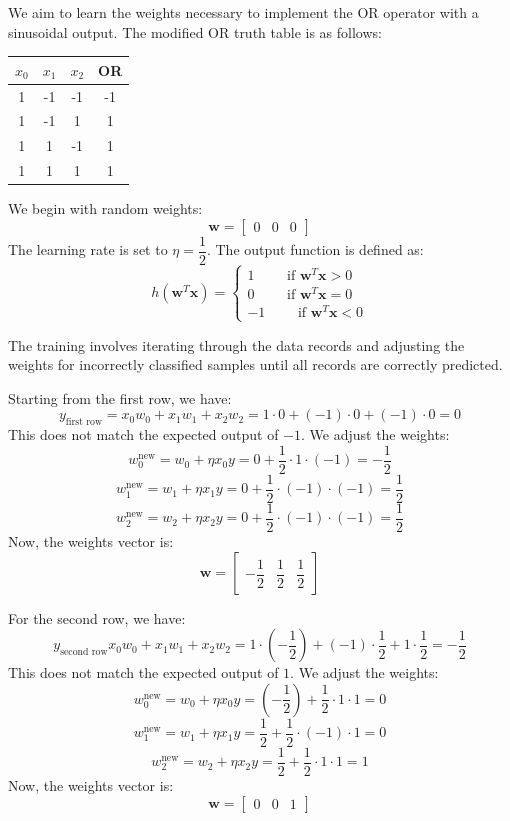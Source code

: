 \begin{example}
    We aim to learn the weights necessary to implement the OR operator with a sinusoidal output. 
    The modified OR truth table is as follows:
    \begin{table}[H]
        \centering
        \begin{tabular}{ccc|c}
        $x_0$ & $x_1$ & $x_2$ & \textbf{OR} \\ \hline
        1     & -1     & -1     & -1           \\
        1     & -1     & 1     & 1           \\
        1     & 1     & -1     & 1           \\
        1     & 1     & 1     & 1          
        \end{tabular}
    \end{table}
    We begin with random weights:
    \[\mathbf{w}=\begin{bmatrix} 0 & 0 & 0 \end{bmatrix}\]
    The learning rate is set to $\eta=\dfrac{1}{2}$. 
    The output function is defined as:
    \[h(\mathbf{w}^T\mathbf{x})=\begin{cases} 1 \qquad\text{ if }\mathbf{w}^T\mathbf{x} > 0 \\ 0 \qquad\text{ if }\mathbf{w}^T\mathbf{x} = 0 \\ -1 \qquad\text{ if }\mathbf{w}^T\mathbf{x} < 0 \end{cases}\]

    The training involves iterating through the data records and adjusting the weights for incorrectly classified samples until all records are correctly predicted.

    Starting from the first row, we have: 
    \[y_{\text{first row}}=x_0w_0+x_1w_1+x_2w_2=1\cdot 0+(-1)\cdot 0 + (-1)\cdot 0=0\]
    This does not match the expected output of $-1$.
    We adjust the weights:
    \[w_0^{\text{new}}=w_0+\eta x_0y=0+\dfrac{1}{2}\cdot 1 \cdot (-1)=-\dfrac{1}{2}\]
    \[w_1^{\text{new}}=w_1+\eta x_1y=0+\dfrac{1}{2}\cdot (-1) \cdot (-1)=\dfrac{1}{2}\]
    \[w_2^{\text{new}}=w_2+\eta x_2y=0+\dfrac{1}{2}\cdot (-1) \cdot (-1)=\dfrac{1}{2}\]
    Now, the weights vector is:
    \[\mathbf{w}=\begin{bmatrix} -\dfrac{1}{2} & \dfrac{1}{2} & \dfrac{1}{2} \end{bmatrix}\]

    For the second row, we have: 
    \[y_{\text{second row}}x_0w_0+x_1w_1+x_2w_2=1\cdot \left(-\dfrac{1}{2}\right)+(-1)\cdot \dfrac{1}{2} + 1\cdot \dfrac{1}{2}=-\dfrac{1}{2}\]
    This does not match the expected output of $1$.
    We adjust the weights:
    \[w_0^{\text{new}}=w_0+\eta x_0y=\left(-\dfrac{1}{2}\right)+\dfrac{1}{2}\cdot 1 \cdot 1=0\]
    \[w_1^{\text{new}}=w_1+\eta x_1y=\dfrac{1}{2}+\dfrac{1}{2}\cdot (-1) \cdot 1=0\]
    \[w_2^{\text{new}}=w_2+\eta x_2y=\dfrac{1}{2}+\dfrac{1}{2}\cdot 1 \cdot 1=1\]
    Now, the weights vector is:
    \[\mathbf{w}=\begin{bmatrix} 0 & 0 & 1 \end{bmatrix}\]


\end{example}
